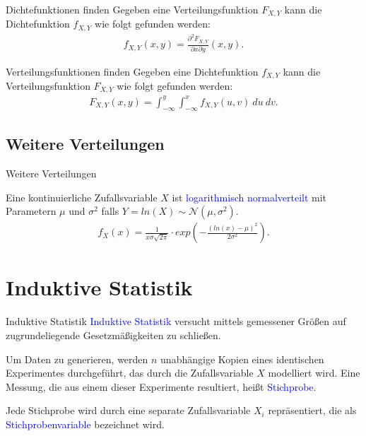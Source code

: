 \documentclass{beamer}
\def\padding{\vspace{0.5cm}}
\def\b{\textcolor{blue}}
\begin{document}
\begin{frame}
    \begin{block}{Dichtefunktionen finden}
        Gegeben eine Verteilungsfunktion $F_{X,Y}$ kann die Dichtefunktion $f_{X,Y}$ wie folgt gefunden werden:
        \begin{align*}
            f_{X,Y}(x,y) = \frac{\partial^2 F_{X,Y}}{\partial x \partial y}(x,y).
        \end{align*}
    \end{block}\pause\par\padding
    \begin{block}{Verteilungsfunktionen finden}
        Gegeben eine Dichtefunktion $f_{X,Y}$ kann die Verteilungsfunktion $F_{X,Y}$ wie folgt gefunden werden:
        \begin{align*}
            F_{X,Y}(x,y) = \int_{- \infty}^y \int_{- \infty}^x f_{X,Y}(u,v)\ du\ dv.
        \end{align*}
    \end{block}
\end{frame}

\subsection{Weitere Verteilungen}
\begin{frame}{Weitere Verteilungen}
    \begin{definition}
        Eine kontinuierliche Zufallsvariable $X$ ist \b{logarithmisch normalverteilt} mit Parametern $\mu$ und $\sigma^2$ falls $Y = ln(X) \sim \mathcal{N}(\mu, \sigma^2)$.\pause
        \begin{align*}
            f_X(x) = \frac{1}{x \sigma \sqrt{2 \pi}} \cdot exp\left(-\frac{(ln(x) - \mu)^2}{2 \sigma^2}\right).
        \end{align*}
    \end{definition}
\end{frame}

\section{Induktive Statistik}
\begin{frame}{Induktive Statistik}
    \b{Induktive Statistik} versucht mittels gemessener Größen auf zugrundeliegende Gesetzmäßigkeiten zu schließen.\pause\par
    Um Daten zu generieren, werden $n$ unabhängige Kopien eines identischen Experimentes durchgeführt, das durch die Zufallsvariable $X$ modelliert wird. Eine Messung, die aus einem dieser Experimente resultiert, heißt \b{Stichprobe}.\pause\par
    Jede Stichprobe wird durch eine separate Zufallsvariable $X_i$ repräsentiert, die als \b{Stichprobenvariable} bezeichnet wird.
\end{frame}
\end{document}
